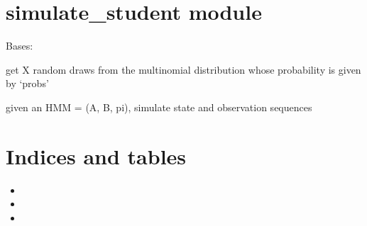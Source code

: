 \documentclass[letterpaper,10pt,english]{sphinxmanual}
\begin{document}
\chapter{simulate\_student module}
\label{\detokenize{simulate_student:module-simulate_student}}\label{\detokenize{simulate_student:simulate-student-module}}\label{\detokenize{simulate_student::doc}}

\begin{fulllineitems}
\label{\detokenize{simulate_student:simulate_student.SimulateStudent}}
Bases: 

\begin{fulllineitems}
\label{\detokenize{simulate_student:simulate_student.SimulateStudent.random_MN_draw}}
get X random draws from the multinomial distribution whose probability is given by ‘probs’

\end{fulllineitems}


\begin{fulllineitems}
\label{\detokenize{simulate_student:simulate_student.SimulateStudent.simulate}}
given an HMM = (A, B, pi), simulate state and observation sequences

\end{fulllineitems}


\end{fulllineitems}



\chapter{Indices and tables}
\label{\detokenize{index:indices-and-tables}}\begin{itemize}
\item {} 

\item {} 

\item {} 

\end{itemize}
\end{document}
